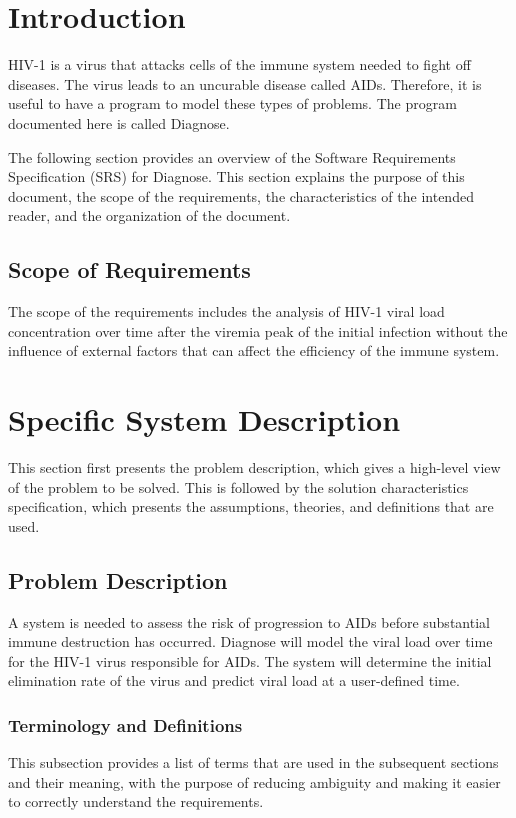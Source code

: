\documentclass[12pt]{article}
\begin{document}
\section{Introduction}
\label{Sec:Intro}
HIV-1 is a virus that attacks cells of the immune system needed to fight off diseases. The virus leads to an uncurable disease called AIDs. Therefore, it is useful to have a program to model these types of problems. The program documented here is called Diagnose.

The following section provides an overview of the Software Requirements Specification (SRS) for Diagnose. This section explains the purpose of this document, the scope of the requirements, the characteristics of the intended reader, and the organization of the document.

\subsection{Scope of Requirements}
\label{Sec:ReqsScope}
The scope of the requirements includes the analysis of HIV-1 viral load concentration over time after the viremia peak of the initial infection without the influence of external factors that can affect the efficiency of the immune system.

\section{Specific System Description}
\label{Sec:SpecSystDesc}
This section first presents the problem description, which gives a high-level view of the problem to be solved. This is followed by the solution characteristics specification, which presents the assumptions, theories, and definitions that are used.

\subsection{Problem Description}
\label{Sec:ProbDesc}
A system is needed to assess the risk of progression to AIDs before substantial immune destruction has occurred. Diagnose will model the viral load over time for the HIV-1 virus responsible for AIDs. The system will determine the initial elimination rate of the virus and predict viral load at a user-defined time.

\subsubsection{Terminology and Definitions}
\label{Sec:TermDefs}
This subsection provides a list of terms that are used in the subsequent sections and their meaning, with the purpose of reducing ambiguity and making it easier to correctly understand the requirements.
\end{document}

